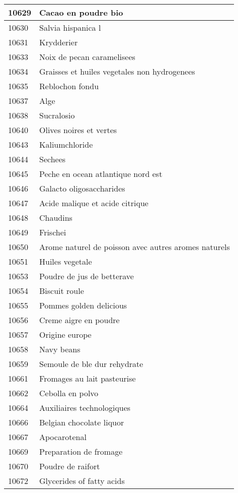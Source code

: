 \begin{longtable}{|l|l|}
10629 & Cacao en poudre bio \\ \hline 
10630 & Salvia hispanica l \\ \hline 
10631 & Krydderier \\ \hline 
10633 & Noix de pecan caramelisees \\ \hline 
10634 & Graisses et huiles vegetales non hydrogenees \\ \hline 
10635 & Reblochon fondu \\ \hline 
10637 & Alge \\ \hline 
10638 & Sucralosio \\ \hline 
10640 & Olives noires et vertes \\ \hline 
10643 & Kaliumchloride \\ \hline 
10644 & Sechees \\ \hline 
10645 & Peche en ocean atlantique nord est \\ \hline 
10646 & Galacto oligosaccharides \\ \hline 
10647 & Acide malique et acide citrique \\ \hline 
10648 & Chaudins \\ \hline 
10649 & Frischei \\ \hline 
10650 & Arome naturel de poisson avec autres aromes naturels \\ \hline 
10651 & Huiles vegetale \\ \hline 
10653 & Poudre de jus de betterave \\ \hline 
10654 & Biscuit roule \\ \hline 
10655 & Pommes golden delicious \\ \hline 
10656 & Creme aigre en poudre \\ \hline 
10657 & Origine europe \\ \hline 
10658 & Navy beans \\ \hline 
10659 & Semoule de ble dur rehydrate \\ \hline 
10661 & Fromages au lait pasteurise \\ \hline 
10662 & Cebolla en polvo \\ \hline 
10664 & Auxiliaires technologiques \\ \hline 
10666 & Belgian chocolate liquor \\ \hline 
10667 & Apocarotenal \\ \hline 
10669 & Preparation de fromage \\ \hline 
10670 & Poudre de raifort \\ \hline 
10672 & Glycerides of fatty acids \\ \hline 

\end{longtable}
